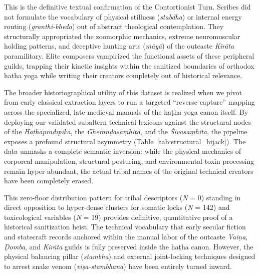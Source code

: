 \documentclass[11pt,twoside,letterpaper]{article}
\begin{document}
This is the definitive textual confirmation of the Contortionist Turn. Scribes did not formulate the vocabulary of physical stillness (\textit{stabdha}) or internal energy routing (\textit{granthi-bheda}) out of abstract theological contemplation. They structurally appropriated the zoomorphic mechanics, extreme neuromuscular holding patterns, and deceptive hunting arts (\textit{māyā}) of the outcaste \textit{Kirāta} paramilitary. Elite composers vampirized the functional assets of these peripheral guilds, trapping their kinetic insights within the sanitized boundaries of orthodox hatha yoga while writing their creators completely out of historical relevance.

The broader historiographical utility of this dataset is realized when we pivot from early classical extraction layers to run a targeted ``reverse-capture'' mapping across the specialized, late-medieval manuals of the ha\d{t}ha yoga canon itself. By deploying our validated subaltern technical lexicons against the structural nodes of the \textit{Ha\d{t}haprad\={\i}pik\={a}}, the \textit{Ghera\d{n}\d{d}asa\d{m}hit\={a}}, and the \textit{\'{S}ivasa\d{m}hit\={a}}, the pipeline exposes a profound structural asymmetry (Table~\ref{tab:structural_hijack}). The data unmasks a complete semantic inversion: while the physical mechanics of corporeal manipulation, structural posturing, and environmental toxin processing remain hyper-abundant, the actual tribal names of the original technical creators have been completely erased.

\begin{table}[ht]
\centering
\caption{The Structural Hijack Matrix: Semantic Frequencies in Hatha Manuals}
\label{tab:structural_hijack}
\end{table}

This zero-floor distribution pattern for tribal descriptors (\textit{N} = 0) standing in direct opposition to hyper-dense clusters for somatic locks (\textit{N} = 142) and toxicological variables (\textit{N} = 19) provides definitive, quantitative proof of a historical sanitization heist. The technical vocabulary that early secular fiction and statecraft records anchored within the manual labor of the outcaste \textit{Vai\d{n}a}, \textit{\d{D}omba}, and \textit{Kir\={a}ta} guilds is fully preserved inside the ha\d{t}ha canon. However, the physical balancing pillar (\textit{stambha}) and external joint-locking techniques designed to arrest snake venom (\textit{vi\d{s}a-stambhana}) have been entirely turned inward. 
\end{document}
